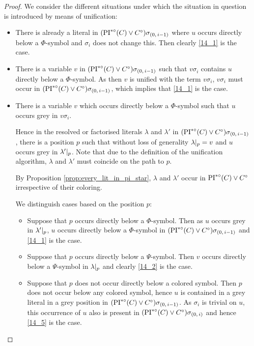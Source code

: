 \documentclass[,%
	draft=false,%
	numbers=noendperiod
	12pt,
	a4paper,
	oneside,%
	openany,
]{memoir}
\newcommand{\inv}{\ensuremath{\PIstarnosigma(C)\lor C\nosigma}}
\newcommand{\invp}{\ensuremath{(\inv)}}
\begin{document}
\begin{proof}
	We consider the different situations under which the situation in question is introduced by means of unification: 

	\begin{itemize}
		\item
			There is already a literal in $\invp\sigmazmi$ where $u$ occurs directly below a $\Phi$-symbol and $\sigma_i$ does not change this.
			Then clearly \ref{14_1} is the case.

		\item
			There is a variable $v$ in $\invp\sigmazmi$ such that $v\sigma_i$ contains $u$ directly below a $\Phi$-symbol.
			As then $v$ is unified with the term $v\sigma_i$, $v\sigma_i$ must occur in $\invp\sigmazmi$, which implies that \ref{14_1} is the case.

		\item
			There is a variable $v$ which occurs directly below a $\Phi$-symbol such that $u$ occurs grey in $v\sigma_i$.

			Hence in the resolved or factorised literals $\lambda$ and $\lambda'$ in $\invp\sigmazmi$, there is a position $p$ such that without loss of generality $\lambda|_{p} = v$ and $u$ occurs grey in $\lambda'|_{p}$. 
			Note that due to the definition of the unification algorithm, $\lambda$ and $\lambda'$ must coincide on the path to $p$.

			By Proposition \ref{prop:every_lit_in_pi_star}, $\lambda$ and $\lambda'$ occur in $\inv$ irrespective of their coloring.

			We distinguish cases based on the position $p$:

			\begin{itemize}
				\item Suppose that $p$ occurs directly below a $\Phi$-symbol.
					Then as $u$ occurs grey in  $\lambda'|_{p}$, $u$ occurs directly below a $\Phi$-symbol in $\invp\sigmazmi$ and \ref{14_1} is the case.

				\item Suppose that $p$ occurs directly below a $\Psi$-symbol.
					Then $v$ occurs directly below a $\Psi$-symbol in $\lambda|_{p}$ and clearly \ref{14_2} is the case.

				\item
					Suppose that $p$ does not occur directly below a colored symbol.
					Then $p$ does not occur below any colored symbol, hence $u$ is contained in a grey literal in a grey position in $\invp\sigmazmi$. 
					As $\sigma_i$ is trivial on $u$, this occurrence of $u$ also is present in $\invp\sigmazi$ and hence \ref{14_5} is the case.
					\qedhere

			\end{itemize}
	\end{itemize}

\end{proof}
\end{document}

